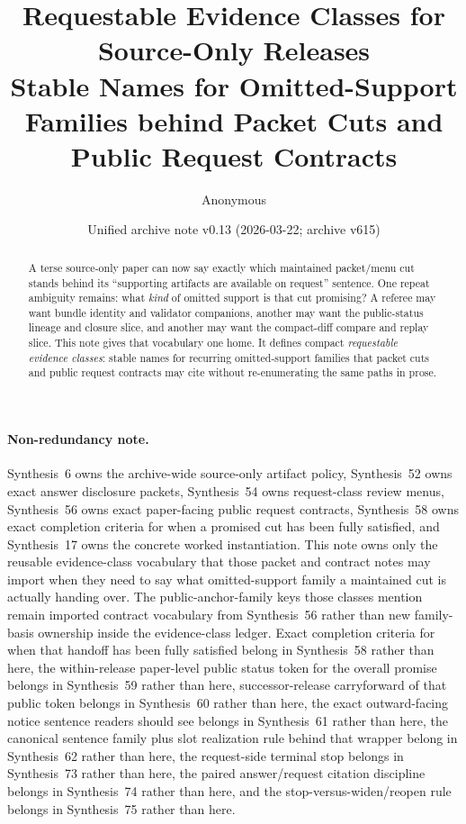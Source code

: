\documentclass[11pt]{article}
\title{Requestable Evidence Classes for Source-Only Releases\\\large Stable Names for Omitted-Support Families behind Packet Cuts and Public Request Contracts}
\author{Anonymous}
\date{Unified archive note v0.13 (2026-03-22; archive v615)}
\begin{document}
\maketitle

\begin{abstract}
A terse source-only paper can now say exactly which maintained packet/menu cut stands behind its ``supporting artifacts are available on request'' sentence. One repeat ambiguity remains: what \emph{kind} of omitted support is that cut promising? A referee may want bundle identity and validator companions, another may want the public-status lineage and closure slice, and another may want the compact-diff compare and replay slice. This note gives that vocabulary one home. It defines compact \emph{requestable evidence classes}: stable names for recurring omitted-support families that packet cuts and public request contracts may cite without re-enumerating the same paths in prose.
\end{abstract}

\paragraph{Non-redundancy note.}
Synthesis~6 owns the archive-wide source-only artifact policy, Synthesis~52 owns exact answer disclosure packets, Synthesis~54 owns request-class review menus, Synthesis~56 owns exact paper-facing public request contracts, Synthesis~58 owns exact completion criteria for when a promised cut has been fully satisfied, and Synthesis~17 owns the concrete worked instantiation.\cite{series:artifactpolicy,series:challengeanswerdisclosurepackets,series:challengeanswerreviewmenus,series:publicrequestcontracts,series:requestfulfillmentcertificates,series:workedexample}
This note owns only the reusable evidence-class vocabulary that those packet and contract notes may import when they need to say what omitted-support family a maintained cut is actually handing over. The public-anchor-family keys those classes mention remain imported contract vocabulary from Synthesis~56 rather than new family-basis ownership inside the evidence-class ledger. Exact completion criteria for when that handoff has been fully satisfied belong in Synthesis~58 rather than here, the within-release paper-level public status token for the overall promise belongs in Synthesis~59 rather than here, successor-release carryforward of that public token belongs in Synthesis~60 rather than here, the exact outward-facing notice sentence readers should see belongs in Synthesis~61 rather than here, the canonical sentence family plus slot realization rule behind that wrapper belong in Synthesis~62 rather than here, the request-side terminal stop belongs in Synthesis~73 rather than here, the paired answer/request citation discipline belongs in Synthesis~74 rather than here, and the stop-versus-widen/reopen rule belongs in Synthesis~75 rather than here.
\end{document}

